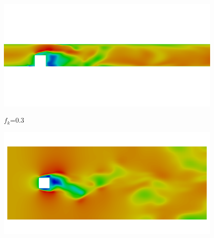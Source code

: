 \begin{figure}[H]
\ContinuedFloat
\begin{minipage}[b]{0.5\linewidth}
\includegraphics[scale=0.25]{figure/coarse/three/Umag_z.png}
\caption*{$f_k$=0.3}
\end{minipage}
\begin{minipage}[b]{0.5\linewidth}
\includegraphics[scale=0.25]{figure/coarse/three/Umag_y.png}
\caption*{}
\end{minipage}\\


\end{figure}
